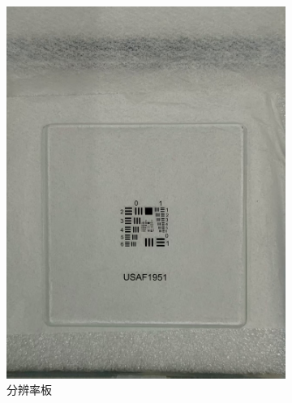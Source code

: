 \documentclass[a4paper]{report} %
\begin{document}
\begin{figure}[htbp]
    \begin{subfigure}{0.22\textwidth}
        \includegraphics[width=\linewidth]{分辨率板.jpg}
        \caption{分辨率板}
    \end{subfigure}
    \begin{subfigure}{0.22\textwidth}

\end{subfigure}
\end{figure}
\end{document}
